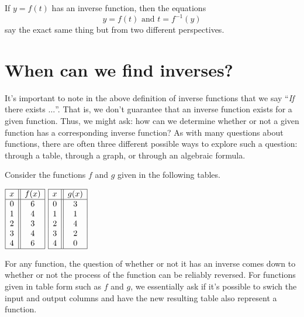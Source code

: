 \documentclass[nooutcomes]{ximera}
\begin{document}
If $y = f(t)$ has an inverse function, then the equations
$$
y = f(t) \text{ and } t = f^{-1}(y)
$$
say the exact same thing but from two different perspectives. 


\section{When can we find inverses?}
 It's important to note in the above definition of inverse functions that we say ``\emph{If} there exists $\ldots$''.  That is, we don't guarantee that an inverse function exists for a given function.  Thus, we might ask: how can we determine whether or not a given function has a corresponding inverse function?  As with many questions about functions, there are often three different possible ways to explore such a question:  through a table, through a graph, or through an algebraic formula.

Consider the functions $f$ and $g$ given in the following tables. 

\begin{center}
$
\begin{array}{ |c || c|  }
 \hline
 x & f(x)\\
 \hline
 0&6\\
 1&4\\
 2&3\\
 3&4\\
 4&6\\
 \hline
\end{array} 
$
\hspace{2cm}
$
\begin{array}{ |c || c|  }
 \hline
 x & g(x)\\
 \hline
 0&3\\
 1&1\\
 2&4\\
 3&2\\
 4&0\\
 \hline
\end{array} 
$
\end{center}

For any function, the question of whether or not it has an inverse comes down to whether or not the process of the function can be reliably reversed.  For functions given in table form such as $f$ and $g$, we essentially ask if it's possible to swich the input and output columns and have the new resulting table also represent a function.
\end{document}
